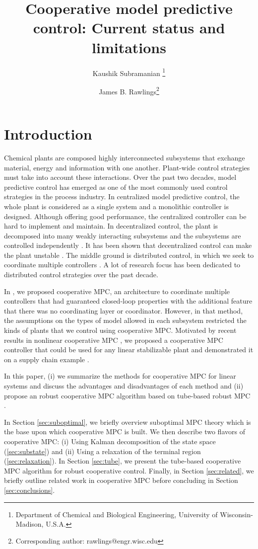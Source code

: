 \documentclass[10pt]{article}
\title{Cooperative  model predictive control: Current status and  limitations }
\author{Kaushik Subramanian \thanks{Department of Chemical and Biological
     Engineering, University of Wisconsin-Madison, U.S.A.}  \and James
  B. Rawlings\footnotemark[1] \thanks{Corresponding author: rawlings@engr.wisc.edu}}
\theoremstyle{definition}
\begin{document}
\maketitle
\section{Introduction}
\label{sec:introduction}
Chemical plants are composed highly interconnected subsystems that
exchange material, energy and information with one another. Plant-wide
control strategies must take into account these interactions. Over the
past two decades, model predictive control has emerged as one of the
most commonly used control strategies in the process industry. 
In centralized model predictive control, the whole plant is considered
as a single system and a monolithic controller is designed. Although
offering good performance, the centralized controller can be hard to
implement and maintain. In decentralized control, the plant is
decomposed into many weakly interacting subsystems and the subsystems
are controlled independently \citep{sandell:varaiya:athans:safonov:1978}. It has been shown that decentralized
control can make the plant unstable \citep{cui:jacobsen:2002}. The middle ground is distributed
control, in which we seek to coordinate multiple controllers \citep{scattolini:2009}. A lot of
research focus has been dedicated to distributed control strategies
over the past decade.

In \citet{stewart:venkat:rawlings:wright:pannocchia:2010}, we proposed cooperative MPC, an architecture to coordinate
multiple controllers that had guaranteed closed-loop properties with
the additional feature that there was no coordinating layer or
coordinator. However, in that method, the assumptions on the types of model
allowed in each subsystem restricted the kinds of plants that we
control using cooperative MPC. Motivated by recent results in
nonlinear cooperative MPC \citet{stewart:wright:rawlings:2011}, we proposed a cooperative MPC controller
that could be used for any linear stabilizable plant and demonstrated
it on a supply chain example \citep{subramanian:rawlings:maravelias:2012}. 

In this paper, (i) we summarize the methods for cooperative MPC for linear
systems and discuss the advantages and disadvantages of each method
and (ii) propose an robust cooperative MPC algorithm based on
tube-based robust MPC \citep[Chapter 3]{rawlings:mayne:2009}.

In Section \ref{sec:suboptimal}, we briefly overview suboptimal MPC
theory which is the base upon which cooperative MPC is built. We then describe two flavors of cooperative MPC:
(i) Using Kalman decomposition of the state space (\ref{sec:substate})
and (ii) Using a relaxation of the terminal region
(\ref{sec:relaxation}). In Section \ref{sec:tube}, we present the
tube-based cooperative MPC algorithm for robust cooperative
control. Finally, in Section \ref{sec:related}, we briefly outline
related work in cooperative MPC before concluding in Section
\ref{sec:conclusions}.
\end{document}
